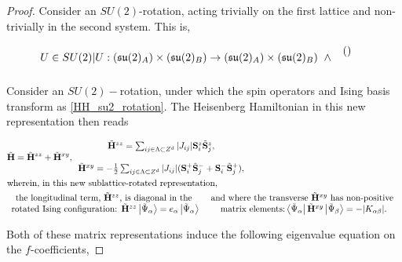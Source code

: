 \documentclass{homework}
\begin{document}
\begin{proof}

Consider an $SU(2)$-rotation, acting trivially on the first lattice and non-trivially in the second system. This is,

$$
    U \in SU(2) | U: (\mathfrak{s}\mathfrak{u}(2)_A) \times (\mathfrak{s}\mathfrak{u}(2)_B) \rightarrow (\mathfrak{s}\mathfrak{u}(2)_A) \times (\mathfrak{s}\mathfrak{u}(2)_B) \textnormal{ } \land \textnormal{ } \begin{array}{cc}
        () &  \\
         & 
    \end{array}
$$

Consider an $SU(2)-$rotation, under which the spin operators and Ising basis transform as \cref{HH_su2_rotation}. The Heisenberg Hamiltonian in this new representation then reads 

\begin{equation}
\begin{split}
    & \tilde{{\bf H}} = \tilde{{\bf H}}^{zz} + \tilde{{\bf H}}^{xy}, \begin{array}{c}
        \tilde{{\bf H}}^{zz} = \sum_{ij \in \Lambda \subset Z^{d}} |J_{ij}| {\bf S}_i^z \tilde{{\bf S}}_j^z, \\  
         \\
        \tilde{{\bf H}}^{xy} = - \frac{1}{2} \sum_{ij \in \Lambda \subset Z^{d}} |J_{ij}| ({\bf S}_i^+ \tilde{{\bf S}}_j^- + {\bf S}_i^- \tilde{{\bf S}}_j^+), \\  
    \end{array} \\
    & \textnormal{wherein, in this new sublattice-rotated representation,} \\
    & \begin{array}{cc}
       \textnormal{the longitudinal term, $\tilde{{\bf H}}^{zz}$, is diagonal in the  } & \textnormal{ and where the transverse $\tilde{{\bf H}}^{xy}$ has non-positive } \\
        \textnormal{rotated Ising configuration: } \tilde{{\bf H}}^{zz}\ket{\tilde{\Psi}_{\alpha}} = e_{\alpha} \ket{\tilde{\Psi}_{\alpha}} & \textnormal{ matrix elements:} 
        \bra{\tilde{\Psi}_{\alpha}} \tilde{{\bf H}}^{xy}  \ket{\tilde{\Psi}_{\beta}} = -|K_{\alpha \beta}|.
    \end{array}
    \label{auerbach's HH hamiltonian}
\end{split}
\end{equation}

Both of these matrix representations induce the following eigenvalue equation on the $f$-coefficients, 


\end{proof}
\end{document}
